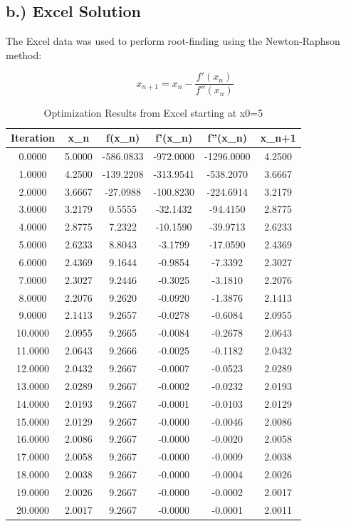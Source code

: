 \documentclass{article}%
\begin{document}
\subsection*{b.) Excel Solution}%
\label{subsec:b.)ExcelSolution}%
The Excel data was used to perform root{-}finding using the Newton{-}Raphson method:%
\par%
\[%
x_{n+1} = x_n - \frac{f'(x_n)}{f''(x_n)}%
\]%
\begin{table}[H]%
\centering%
\begin{tabular}{cccccc}%
\hline%
Iteration&x\_n&f(x\_n)&f'(x\_n)&f''(x\_n)&x\_n+1\\%
\hline%
0.0000&5.0000&{-}586.0833&{-}972.0000&{-}1296.0000&4.2500\\%
\hline%
1.0000&4.2500&{-}139.2208&{-}313.9541&{-}538.2070&3.6667\\%
\hline%
2.0000&3.6667&{-}27.0988&{-}100.8230&{-}224.6914&3.2179\\%
\hline%
3.0000&3.2179&0.5555&{-}32.1432&{-}94.4150&2.8775\\%
\hline%
4.0000&2.8775&7.2322&{-}10.1590&{-}39.9713&2.6233\\%
\hline%
5.0000&2.6233&8.8043&{-}3.1799&{-}17.0590&2.4369\\%
\hline%
6.0000&2.4369&9.1644&{-}0.9854&{-}7.3392&2.3027\\%
\hline%
7.0000&2.3027&9.2446&{-}0.3025&{-}3.1810&2.2076\\%
\hline%
8.0000&2.2076&9.2620&{-}0.0920&{-}1.3876&2.1413\\%
\hline%
9.0000&2.1413&9.2657&{-}0.0278&{-}0.6084&2.0955\\%
\hline%
10.0000&2.0955&9.2665&{-}0.0084&{-}0.2678&2.0643\\%
\hline%
11.0000&2.0643&9.2666&{-}0.0025&{-}0.1182&2.0432\\%
\hline%
12.0000&2.0432&9.2667&{-}0.0007&{-}0.0523&2.0289\\%
\hline%
13.0000&2.0289&9.2667&{-}0.0002&{-}0.0232&2.0193\\%
\hline%
14.0000&2.0193&9.2667&{-}0.0001&{-}0.0103&2.0129\\%
\hline%
15.0000&2.0129&9.2667&{-}0.0000&{-}0.0046&2.0086\\%
\hline%
16.0000&2.0086&9.2667&{-}0.0000&{-}0.0020&2.0058\\%
\hline%
17.0000&2.0058&9.2667&{-}0.0000&{-}0.0009&2.0038\\%
\hline%
18.0000&2.0038&9.2667&{-}0.0000&{-}0.0004&2.0026\\%
\hline%
19.0000&2.0026&9.2667&{-}0.0000&{-}0.0002&2.0017\\%
\hline%
20.0000&2.0017&9.2667&{-}0.0000&{-}0.0001&2.0011\\%
\hline%
\end{tabular}%
\caption{Optimization Results from Excel starting at x0=5}%
\end{table}%
\end{document}
